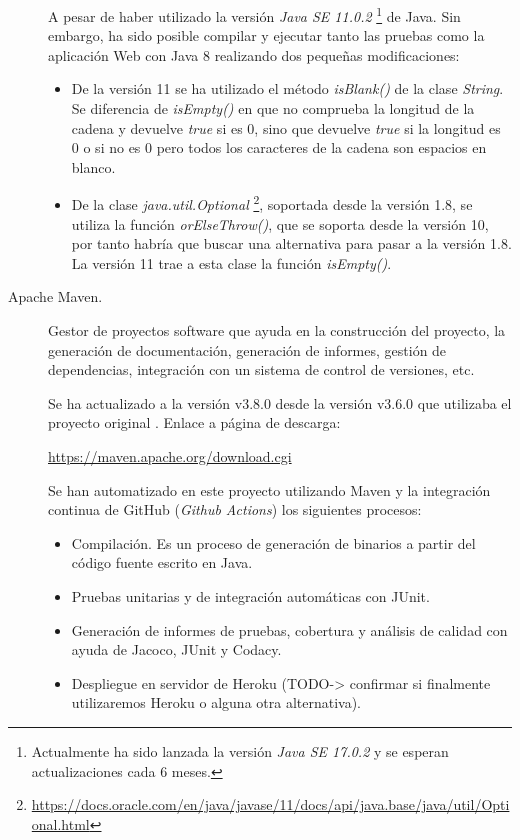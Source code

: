 \begin{description}
		A pesar de haber utilizado la versión \textit{Java SE 11.0.2} \footnote{Actualmente ha sido lanzada la versión \textit{Java SE 17.0.2} y se esperan actualizaciones cada 6 meses.} de Java. Sin embargo, ha sido posible compilar y ejecutar tanto las pruebas como la aplicación Web con Java 8 realizando dos pequeñas modificaciones:
		\begin{itemize}
			\item De la versión 11 se ha utilizado el método \textit{isBlank()} de la clase \textit{String}. Se diferencia de \textit{isEmpty()} en que no comprueba la longitud de la cadena y devuelve \textit{true} si es 0, sino que devuelve \textit{true} si la longitud es 0 o si no es 0 pero todos los caracteres de la cadena son espacios en blanco.
			\item De la clase \textit{java.util.Optional} \footnote{\url{https://docs.oracle.com/en/java/javase/11/docs/api/java.base/java/util/Optional.html}}, soportada desde la versión 1.8, se utiliza la función \textit{orElseThrow()}, que se soporta desde la versión 10, por tanto habría que buscar una alternativa para pasar a la versión 1.8. La versión 11 trae a esta clase la función \textit{isEmpty()}.
		\end{itemize}
	\item[Apache Maven.] Gestor de proyectos software que ayuda en la construcción del proyecto, la generación de documentación, generación de informes, gestión de dependencias, integración con un sistema de control de versiones, etc. 
	
		Se ha actualizado a la versión v3.8.0 desde la versión  v3.6.0 que utilizaba el proyecto original \cite{TFGPrevio}. Enlace a página de descarga:
		
		\url{https://maven.apache.org/download.cgi}
		
		Se han automatizado en este proyecto utilizando Maven y la integración continua de GitHub (\textit{Github Actions}) los siguientes procesos:
		\begin{itemize}
			\item Compilación. Es un proceso de generación de binarios a partir del código fuente escrito en Java.
			\item Pruebas unitarias y de integración automáticas con JUnit.
			\item Generación de informes de pruebas, cobertura y análisis de calidad con ayuda de Jacoco, JUnit y Codacy.
			\item Despliegue en servidor de Heroku (TODO-> confirmar si finalmente utilizaremos Heroku o alguna otra alternativa).
		\end{itemize}
	

\end{description}
